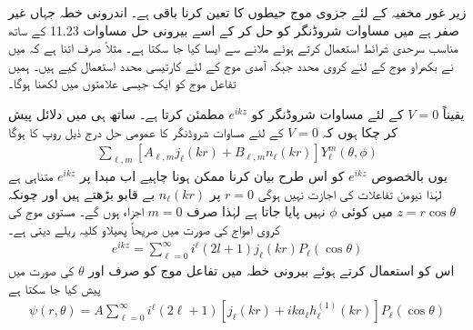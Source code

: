 زیر غور مخفیہ کے لئے جزوی موج حیطوں  کا تعین کرنا باقی ہے۔ اندرونی خطہ جہاں  غیر صفر ہے میں مساوات شروڈنگر کو حل کر کے اسے بیرونی حل مساوات \num{11.23} کے ساتھ مناسب سرحدی شرائط استعمال کرتے ہوئے ملانے سے ایسا کیا جا سکتا ہے۔ مثلاً صرف اتنا ہے کہ میں نے بکھراو موج کے لئے کروی محدد جبکہ آمدی موج کے لئے کارتیسی محدد استعمال کیے  ہیں۔ ہمیں تفاعل موج کو ایک جیسی علامتوں میں لکھنا ہوگا۔

یقیناً \(V=0\) کے لئے مساوات شروڈنگر کو \(e^{ikz}\) مطمئن کرتا ہے۔ ساتھ ہی میں دلائل پیش کر چکا ہوں کہ \(V=0\) کے لئے مساوات شروڈنگر کا عمومی حل درج ذیل روپ کا ہوگا
\begin{align*}
	\sum_{\ell, m}\left[A_{\ell, m}j_{\ell}(kr)+B_{\ell, m}n_{\ell}(kr)\right]Y_{\ell}^m(\theta, \phi)
\end{align*}
یوں بالخصوص \(e^{ikz}\) کو اس طرح بیان کرنا ممکن ہونا چاہیے اب مبدا پر \(e^{ikz}\) متناہی ہے لہٰذا نیومن تفاعلات کی اجازت نہیں ہوگی \(r=0\) پر \(n_{\ell}(kr)\) بے قابو بڑھتے ہیں اور چونکہ \(z=r\cos\theta\) میں کوئی \(\phi\) نہیں پایا جاتا ہے لہٰذا صرف \(m=0\) اجزاء ہوں گے۔ مستوی موج کی کروی امواج کی صورت میں صریحاً پھیلاو کلیہ ریلے دیتی ہے۔
\begin{align}
	e^{ikz} = \sum_{\ell=0}^{\infty}i^{\ell}(2l+1)j_{\ell}(kr)P_{\ell}(\cos\theta)
\end{align}
اس کو استعمال کرتے ہوئے بیرونی خطہ میں تفاعل موج کو صرف  اور \(\theta\) کی صورت میں پیش کیا جا سکتا ہے
\begin{align}
	\psi(r, \theta) = A\sum_{\ell=0}^{\infty}i^{\ell}(2\ell+1)\left[j_{\ell}(kr)+ika_{\ell}h_{\ell}^{(1)}(kr)\right]P_{\ell}(\cos\theta)
\end{align}


